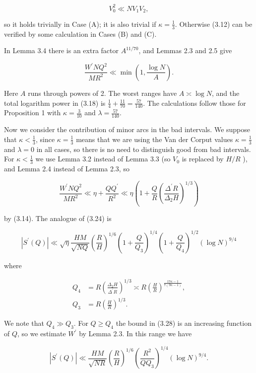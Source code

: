 \documentclass[10pt]{article}
\begin{document}
$$
V_{0}^{2} \ll N V_{1} V_{2},
$$

so it holds trivially in Case (A); it is also trivial if $\kappa=\frac{1}{3}$. Otherwise (3.12) can be verified by some calculation in Cases (B) and (C).

In Lemma 3.4 there is an extra factor $A^{11 / 70}$, and Lemmas 2.3 and 2.5 give

$$
\frac{W^{\prime} N Q^{2}}{M R^{2}} \ll \min \left(1, \frac{\log N}{A}\right).
$$

Here $A$ runs through powers of 2. The worst ranges have $A \asymp \log N$, and the total logarithm power in (3.18) is $\frac{1}{4}+\frac{11}{70}=\frac{57}{140}$. The calculations follow those for Proposition 1 with $\kappa=\frac{3}{10}$ and $\lambda=\frac{57}{140}$.

Now we consider the contribution of minor arcs in the bad intervals. We suppose that $\kappa<\frac{1}{3}$, since $\kappa=\frac{1}{3}$ means that we are using the Van der Corput values $\kappa=\frac{1}{3}$ and $\lambda=0$ in all cases, so there is no need to distinguish good from bad intervals. For $\kappa<\frac{1}{3}$ we use Lemma 3.2 instead of Lemma 3.3 (so $V_{0}$ is replaced by $H / R$ ), and Lemma 2.4 instead of Lemma 2.3, so

$$
\frac{W^{\prime} N Q^{2}}{M R^{2}} \ll \eta+\frac{Q Q^{\prime}}{R^{2}} \ll \eta\left(1+\frac{Q}{R}\left(\frac{\Delta^{\prime} R}{\Delta_{2} H}\right)^{1 / 3}\right)
$$

by (3.14). The analogue of (3.24) is


\begin{equation*}
\left|S^{\prime}(Q)\right| \ll \sqrt{\eta} \frac{H M}{\sqrt{N Q}}\left(\frac{R}{H}\right)^{1 / 6}\left(1+\frac{Q}{Q_{3}}\right)^{1 / 4}\left(1+\frac{Q}{Q_{4}}\right)^{1 / 2}(\log N)^{9 / 4} \tag{3.28}
\end{equation*}


where

$$
\begin{aligned}
Q_{4} & =R\left(\frac{\Delta_{2} H}{\Delta^{\prime} R}\right)^{1 / 3} \asymp R\left(\frac{H}{R}\right)^{\frac{17 \kappa-1}{7(9 \kappa-1)}}, \\
Q_{3} & =R\left(\frac{H}{R}\right)^{1 / 3}.
\end{aligned}
$$

We note that $Q_{4} \gg Q_{3}$. For $Q \geqslant Q_{4}$ the bound in (3.28) is an increasing function of $Q$, so we estimate $W^{\prime}$ by Lemma 2.3. In this range we have


\begin{equation*}
\left|S^{\prime}(Q)\right| \ll \frac{H M}{\sqrt{N R}}\left(\frac{R}{H}\right)^{1 / 6}\left(\frac{R^{2}}{Q Q_{3}}\right)^{1 / 4}(\log N)^{9 / 4}. \tag{3.29}
\end{equation*}
\end{document}
